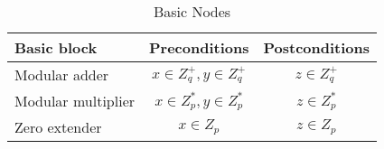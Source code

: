 \begin{table}[h!]
  \centering
  \begin{tabular}{l | c | c}
    Basic block        & Preconditions             & Postconditions \\
    \hline
    Modular adder      & $x \in Z_q^+, y \in Z_q^+$ & $z \in Z_q^+$ \\ 
    Modular multiplier & $x \in Z_p^*, y \in Z_p^*$ & $z \in Z_p^*$ \\
    Zero extender      & $x \in Z_p$               & $z \in Z_p$
  \end{tabular}
  \caption{Basic Nodes}
  \label{tab:basic_nodes}
\end{table}

